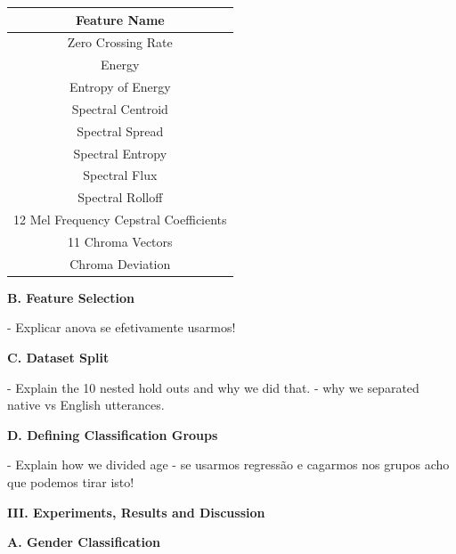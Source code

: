 \documentclass{article}
\begin{document}
\begin{center}
\label{table1} %
\begin{tabular}[c]{ |c| } 
 \hline
 \textbf{Feature Name}  \\ [1ex]
 \hline
 Zero Crossing Rate \\ [0.5ex]
 Energy \\ [0.5ex]
 Entropy of Energy \\ [0.5ex]
 Spectral Centroid  \\ [0.5ex]
 Spectral Spread \\ [0.5ex]
 Spectral Entropy \\ [0.5ex]
 Spectral Flux \\ [0.5ex]
 Spectral Rolloff \\ [0.5ex]
 12 Mel Frequency Cepstral Coefficients \\ [0.5ex]
 11 Chroma Vectors \\ [0.5ex]
 Chroma Deviation \\ [0.5ex]
 \hline
\end{tabular}
\end{center}

\vspace{2mm}
\textbf{ B. Feature Selection }\par

- Explicar anova se efetivamente usarmos!\par

\vspace{2mm}
\textbf{ C. Dataset Split }\par
- Explain the 10 nested hold outs and why we did that.
- why we separated native vs English utterances.\par

\vspace{2mm}
\textbf{ D. Defining Classification Groups }\par
- Explain how we divided age - se usarmos regressão e cagarmos nos grupos acho que podemos tirar isto!\par



\vspace{2mm}
\textbf{III. Experiments, Results and Discussion }\par

\vspace{2mm}
\textbf{ A. Gender Classification }\par
\end{document}
